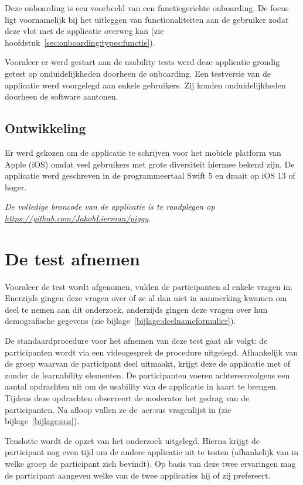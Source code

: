 Deze onboarding is een voorbeeld van een functiegerichte onboarding. De focus ligt voornamelijk bij het uitleggen van functionaliteiten aan de gebruiker zodat deze vlot met de applicatie overweg kan (zie hoofdstuk~\ref{sec:onboarding:types:functie}).

Vooraleer er werd gestart aan de usability tests werd deze applicatie grondig getest op onduidelijkheden doorheen de onboarding. Een testversie van de applicatie werd voorgelegd aan enkele gebruikers. Zij konden onduidelijkheden doorheen de software aantonen.

\subsection{Ontwikkeling}
\label{sec:applicatie:ontwikkeling}

Er werd gekozen om de applicatie te schrijven voor het mobiele platform van Apple (iOS) omdat veel gebruikers met grote diversiteit hiermee bekend zijn. De applicatie werd geschreven in de programmeertaal Swift 5 en draait op iOS 13 of hoger.

\textit{De volledige broncode van de applicatie is te raadplegen op \url{https://github.com/JakobLierman/piggy}.}

\section{De test afnemen}
\label{sec:test-afnemen}

Vooraleer de test wordt afgenomen, vulden de participanten al enkele vragen in. Enerzijds gingen deze vragen over of ze al dan niet in aanmerking kwamen om deel te nemen aan dit onderzoek, anderzijds gingen deze vragen over hun demografische gegevens (zie bijlage~\ref{bijlage:deelnameformulier}).

De standaardprocedure voor het afnemen van deze test gaat als volgt: de participanten wordt via een videogesprek de procedure uitgelegd. Afhankelijk van de groep waarvan de participant deel uitmaakt, krijgt deze de applicatie met of zonder de learnability elementen. De participanten voeren achtereenvolgens een aantal opdrachten uit om de usability van de applicatie in kaart te brengen. Tijdens deze opdrachten observeert de moderator het gedrag van de participanten. Na afloop vullen ze de~\acrshort{acr:sus} vragenlijst in (zie bijlage~\ref{bijlage:sus}).

Tenslotte wordt de opzet van het onderzoek uitgelegd. Hierna krijgt de participant nog even tijd om de andere applicatie uit te testen (afhankelijk van in welke groep de participant zich bevindt). Op basis van deze twee ervaringen mag de participant aangeven welke van de twee applicaties hij of zij prefereert.
